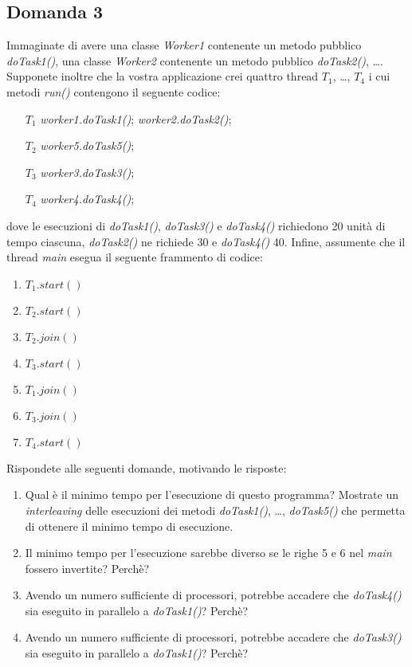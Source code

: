 \newpage

\subsection{Domanda 3}
Immaginate di avere una classe \textit{Worker1} contenente un metodo pubblico \textit{doTask1()}, una classe \textit{Worker2} contenente un metodo pubblico \textit{doTask2()}, \ldots . Supponete inoltre che la vostra applicazione crei quattro thread $T_1$, \ldots, $T_4$ i cui metodi \textit{run()} contengono il seguente codice:
\begin{itemize}
	\item[$T_1$] \textit{worker1.doTask1()}; \textit{worker2.doTask2()};
	\item[$T_2$] \textit{worker5.doTask5()};
	\item[$T_3$] \textit{worker3.doTask3()};
	\item[$T_4$] \textit{worker4.doTask4()};
\end{itemize}
dove le esecuzioni di \textit{doTask1()}, \textit{doTask3()} e \textit{doTask4()} richiedono 20 unit\`{a} di tempo ciascuna, \textit{doTask2()} ne richiede 30 e \textit{doTask4()} 40. Infine, assumente che il thread \textit{main} esegua il seguente frammento di codice:
\begin{enumerate}
	\item $T_1.start()$
	\item $T_2.start()$
	\item $T_2.join()$
	\item $T_3.start()$
	\item $T_1.join()$
	\item $T_3.join()$
	\item $T_4.start()$
\end{enumerate}
Rispondete alle seguenti domande, motivando le risposte:
\begin{enumerate}
	\item Qual è il minimo tempo per l'esecuzione di questo programma? Mostrate un \textit{interleaving} delle esecuzioni dei metodi \textit{doTask1()}, \ldots, \textit{doTask5()} che permetta di ottenere il minimo tempo di esecuzione.
	\item Il minimo tempo per l'esecuzione sarebbe diverso se le righe 5 e 6 nel \textit{main} fossero invertite? Perch\`e?
	\item Avendo un numero sufficiente di processori, potrebbe accadere che \textit{doTask4()} sia eseguito in parallelo a \textit{doTask1()}? Perch\`e?
	\item Avendo un numero sufficiente di processori, potrebbe accadere che \textit{doTask3()} sia eseguito in parallelo a \textit{doTask1()}? Perch\`e?
\end{enumerate}

